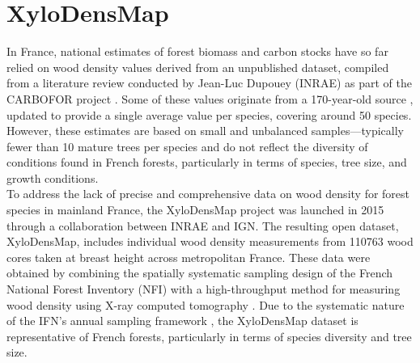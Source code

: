 \chapter{XyloDensMap}

In France, national estimates of forest biomass and carbon stocks have so far relied on wood density values derived from an unpublished dataset, compiled from a literature review conducted by Jean-Luc Dupouey (INRAE) as part of the CARBOFOR project \parencite{Loustau2004}. Some of these values originate from a 170-year-old source \parencite{Mathieu1855}, updated to provide a single average value per species, covering around 50 species. However, these estimates are based on small and unbalanced samples—typically fewer than 10 mature trees per species and do not reflect the diversity of conditions found in French forests, particularly in terms of species, tree size, and growth conditions. \\

To address the lack of precise and comprehensive data on wood density for forest species in mainland France, the Xylo\-Dens\-Map project was launched in 2015 through a collaboration between INRAE and IGN. The resulting open dataset, Xylo\-Dens\-Map, includes individual wood density measurements from \num{110763} wood cores taken at breast height across metropolitan France. These data were obtained by combining the spatially systematic sampling design of the French National Forest Inventory (NFI) with a high-throughput method for measuring wood density using X-ray computed tomography \parencite{Freyburger2009,Jacquin2019}. Due to the systematic nature of the IFN's annual sampling framework \parencite{Bontemps2024,Bouriaud2023}, the Xylo\-Dens\-Map dataset is representative of French forests, particularly in terms of species diversity and tree size. \\

